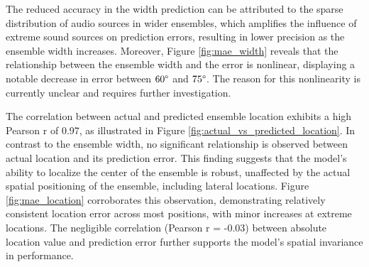 \documentclass[11pt]{article}
\begin{document}
The reduced accuracy in the width prediction can be attributed to the sparse distribution of audio sources in wider ensembles, which amplifies the influence of extreme sound sources on prediction errors, resulting in lower precision as the ensemble width increases. Moreover, Figure \ref{fig:mae_width} reveals that the relationship between the ensemble width and the error is nonlinear, displaying a notable decrease in error between $60\degree$ and $75\degree$. The reason for this nonlinearity is currently unclear and requires further investigation.

The correlation between actual and predicted ensemble location exhibits a high Pearson r of 0.97, as illustrated in Figure \ref{fig:actual_vs_predicted_location}. In contrast to the ensemble width, no significant relationship is observed between actual location and its prediction error. This finding suggests that the model's ability to localize the center of the ensemble is robust, unaffected by the actual spatial positioning of the ensemble, including lateral locations. Figure \ref{fig:mae_location} corroborates this observation, demonstrating relatively consistent location error across most positions, with minor increases at extreme locations. The negligible correlation (Pearson r = -0.03) between absolute location value and prediction error further supports the model's spatial invariance in performance.
\end{document}
